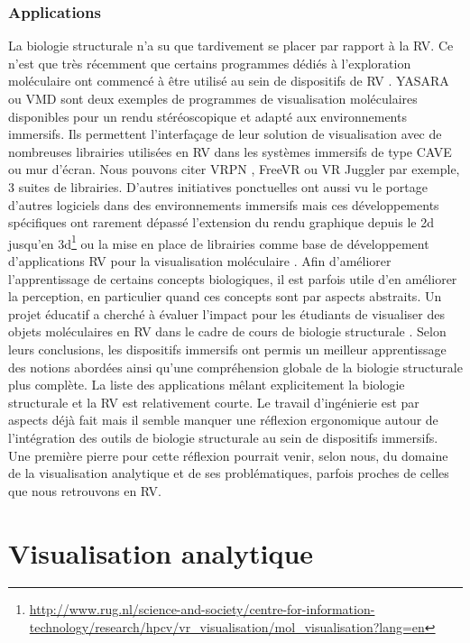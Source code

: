 \subsubsection{Applications}

La biologie structurale n'a su que tardivement se placer par rapport à la RV. Ce n'est que très récemment que certains programmes dédiés à l'exploration moléculaire ont commencé à être utilisé au sein de dispositifs de RV \cite{odonoghue_visualization_2010}. YASARA \cite{krieger2014yasara} ou VMD \cite{stone_immersive_2010} sont deux exemples de programmes de visualisation moléculaires disponibles pour un rendu stéréoscopique et adapté aux environnements immersifs. Ils permettent l'interfaçage de leur solution de visualisation avec de nombreuses librairies utilisées en RV dans les systèmes immersifs de type CAVE ou mur d'écran. Nous pouvons citer VRPN \cite{taylor2001vrpn}, FreeVR \cite{pape2004commodity} ou VR Juggler par exemple, 3 suites de librairies. 
D'autres initiatives ponctuelles ont aussi vu le portage d'autres logiciels dans des environnements immersifs mais ces développements spécifiques ont rarement dépassé l'extension du rendu graphique depuis le 2d jusqu'en 3d\footnote{\url{http://www.rug.nl/science-and-society/centre-for-information-technology/research/hpcv/vr\_visualisation/mol\_visualisation?lang=en}} ou la mise en place de librairies comme base de développement d'applications RV pour la visualisation moléculaire \cite{salvadori_moka:_2014}.  Afin d'améliorer l'apprentissage de certains concepts biologiques, il est parfois utile d'en améliorer la perception, en particulier quand ces concepts sont par aspects abstraits. Un projet éducatif a cherché à évaluer l'impact pour les étudiants de visualiser des objets moléculaires en RV dans le cadre de cours de biologie structurale \cite{tan_use_2013}. Selon leurs conclusions, les dispositifs immersifs ont permis un meilleur apprentissage des notions abordées ainsi qu'une compréhension globale de la biologie structurale plus complète.
La liste des applications mêlant explicitement la biologie structurale et la RV est relativement courte. Le travail d'ingénierie est par aspects déjà fait mais il semble manquer une réflexion ergonomique autour de l'intégration des outils de biologie structurale au sein de dispositifs immersifs. Une première pierre pour cette réflexion pourrait venir, selon nous, du domaine de la visualisation analytique et de ses problématiques, parfois proches de celles que nous retrouvons en RV.

\section{Visualisation analytique}

